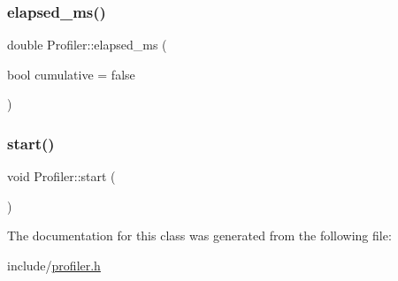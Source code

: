 \subsubsection{\texorpdfstring{elapsed\_ms()}{elapsed\_ms()}}
{\footnotesize\ttfamily double Profiler\+::elapsed\+\_\+ms (\begin{DoxyParamCaption}\item[{bool}]{cumulative = {\ttfamily false} }\end{DoxyParamCaption})\hspace{0.3cm}{\ttfamily [inline]}}

\mbox{\label{class_profiler_a550862878d592d4c7e34a429db84b372}} 
\subsubsection{\texorpdfstring{start()}{start()}}
{\footnotesize\ttfamily void Profiler\+::start (\begin{DoxyParamCaption}{ }\end{DoxyParamCaption})\hspace{0.3cm}{\ttfamily [inline]}}



The documentation for this class was generated from the following file\+:\begin{DoxyCompactItemize}
\item 
include/\mbox{\hyperlink{profiler_8h}{profiler.\+h}}\end{DoxyCompactItemize}
